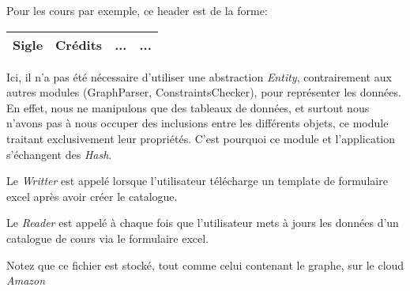 Pour les cours par exemple, ce header est de la forme:
\begin{table}[H]
\centering
\begin{tabular}{| c | c | c | c |}
\hline
\textbf{Sigle} & \textbf{Crédits} & \textbf{...} & \textbf{...}\\
\hline
\end{tabular}  
\end{table}

Ici, il n'a pas été nécessaire d'utiliser une abstraction \textit{Entity}, contrairement aux autres modules (GraphParser, ConstraintsChecker), pour représenter les données. En effet, nous ne manipulons que des tableaux de données, et surtout nous n'avons pas à nous occuper des inclusions entre les différents objets, ce module traitant exclusivement leur propriétés. C'est pourquoi ce module et l'application s'échangent des \textit{Hash}. 


Le \textit{Writter} est appelé lorsque l'utilisateur télécharge un template de formulaire excel après avoir créer le catalogue. 

Le \textit{Reader} est appelé à chaque fois que l'utilisateur mets à jours  les données d'un catalogue de cours via le formulaire excel. 


Notez que ce fichier est stocké, tout comme celui contenant le graphe, sur le cloud \textit{Amazon}
